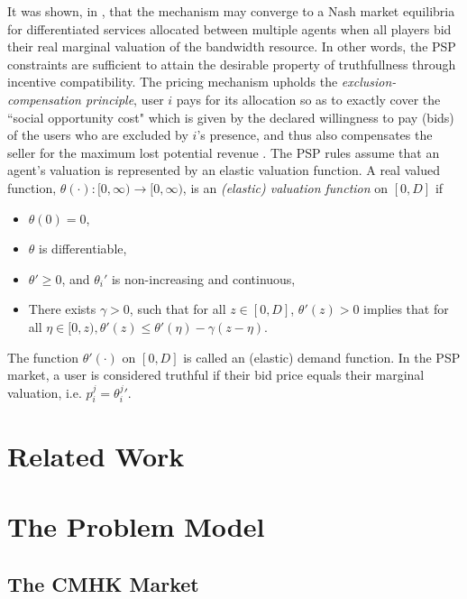 \documentclass[sigconf, anonymous]{acmart}
\theoremstyle{definition}
\begin{document}
It was shown, in \cite{lazar}, that the mechanism may converge to a Nash market
equilibria for differentiated services
allocated between multiple agents when all players bid their real marginal valuation
of the bandwidth resource. In other words, the PSP constraints are
sufficient to attain the desirable property of truthfullness through incentive
compatibility. The pricing mechanism upholds the \emph{exclusion-compensation
principle}, user $i$
pays for its allocation so as to exactly cover the ``social opportunity cost"
which is given by the declared willingness to pay (bids) of the users who are
excluded by $i$'s presence, and thus also compensates the seller for the maximum lost potential
revenue \cite{lazar}.
The PSP rules assume that an agent's valuation is represented by an elastic valuation function.
A real valued function, $\theta(\cdot): [0,\infty) \rightarrow [0,\infty)$, is an \emph{(elastic) valuation
function} on $[0, D]$ if 
\begin{itemize}
    \item $\theta(0) = 0$,
    \item $\theta$ is differentiable,
    \item ${\theta}' \ge 0$, and ${\theta_i}'$ is non-increasing and continuous,
     \item There exists $\gamma > 0$, such that for all $z \in [0,D]$,
${\theta}'(z) > 0$ implies that for all $\eta \in [0, z), {\theta}'(z) \le
{\theta}'(\eta)
- \gamma(z - \eta)$. 
\end{itemize}
The function $\theta'(\cdot)$ on $[0, D]$ is called an (elastic) demand
function.
In the PSP market, a
user is considered truthful if their bid price equals their marginal valuation,
i.e. $p_i^j = {\theta_i^j}'$.


\section{Related Work}

\section{The Problem Model}


\subsection{The CMHK Market}
\end{document}
